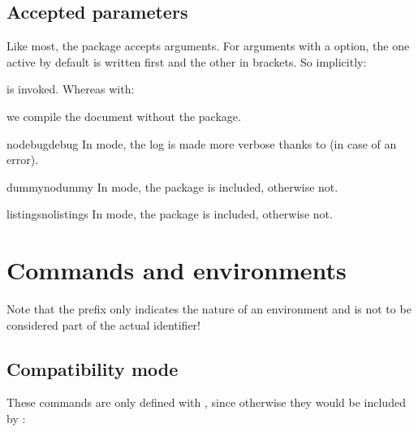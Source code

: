 \documentclass{sopra-base}
\begin{document}
    \subsection{Accepted parameters}
    Like most, the package accepts arguments.
    For arguments with a  option, the one active by default is written first and the other in brackets.
    So implicitly:
\begin{plainlatex}
    \usepackage[nodebug,dummy,listings]{sopra-documentation}
\end{plainlatex}
    is invoked. Whereas with:
\begin{plainlatex}
    \usepackage[nolistings]{sopra-documentation}
\end{plainlatex}
    we compile the document without the  package.

    \begin{argument}{nodebug}{debug}
        \label{mrk:debug}In  mode, the log is made more verbose thanks to  (in case of an error).
    \end{argument}

    \begin{argument}{dummy}{nodummy}
        \label{mrk:nodummy}In  mode, the  package is included, otherwise not.
    \end{argument}

    \begin{argument}{listings}{nolistings}
        \label{mrk:nolistings}In  mode, the  package is included, otherwise not.
    \end{argument}

\section{Commands and environments}

Note that the prefix  only indicates the nature of an environment and is not to be considered part of the actual identifier!


\subsection{Compatibility mode}

\begin{center}
\end{center}

These commands are only defined with , since otherwise they would be included by :
\end{document}
